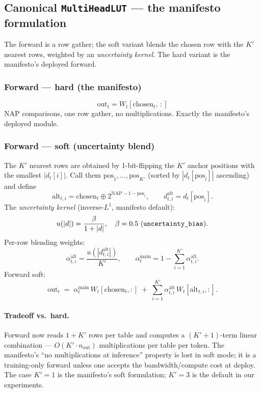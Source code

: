\documentclass[11pt]{article}
\begin{document}
\subsection{Canonical \texttt{MultiHeadLUT} --- the manifesto formulation}
\label{sec:can}

The forward is a row gather; the soft variant blends the chosen row with the
$K'$ nearest rows, weighted by an \emph{uncertainty kernel}. The hard
variant is the manifesto's deployed forward.

\subsubsection{Forward --- hard (the manifesto)}\label{sec:can-hard}
\[
  \text{out}_t = W_t[\mathrm{chosen}_t,\,:]
\]
NAP comparisons, one row gather, no multiplications. Exactly the manifesto's
deployed module.

\subsubsection{Forward --- soft (uncertainty blend)}\label{sec:can-soft}

The $K'$ nearest rows are obtained by 1-bit-flipping the $K'$ anchor
positions with the smallest $|d_t[i]|$. Call them $\mathrm{pos}_1,\ldots,\mathrm{pos}_{K'}$
(sorted by $|d_t[\mathrm{pos}_i]|$ ascending) and define
\[
  \mathrm{alt}_{t,i} = \mathrm{chosen}_t\oplus 2^{\mathrm{NAP}-1-\mathrm{pos}_i},
  \qquad
  d_{t,i}^{\mathrm{alt}} = d_t[\mathrm{pos}_i].
\]
The \emph{uncertainty kernel} (inverse-$L^1$, manifesto default):
\[
  u(|d|) = \frac{\beta}{1+|d|},\quad \beta=0.5\ \text{(\texttt{uncertainty\_bias})}.
\]
Per-row blending weights:
\[
  \alpha_{t,i}^{\mathrm{alt}} = \frac{u(|d_{t,i}^{\mathrm{alt}}|)}{K'},\qquad
  \alpha_t^{\mathrm{main}} = 1-\sum_{i=1}^{K'}\alpha_{t,i}^{\mathrm{alt}}.
\]
Forward soft:
\[
  \text{out}_t \;=\; \alpha_t^{\mathrm{main}}\,W_t[\mathrm{chosen}_t,:]
                 \;+\; \sum_{i=1}^{K'}\alpha_{t,i}^{\mathrm{alt}}\,W_t[\mathrm{alt}_{t,i},:].
\]

\paragraph{Tradeoff vs.\ hard.} Forward now reads $1{+}K'$ rows per table
and computes a $(K'{+}1)$-term linear combination ---
$O(K'\cdot n_{\mathrm{out}})$ multiplications per table per token. The
manifesto's ``no multiplications at inference'' property is lost in soft
mode; it is a training-only forward unless one accepts the
bandwidth/compute cost at deploy. The case $K'{=}1$ is the manifesto's
soft formulation; $K'{=}3$ is the default in our experiments.
\end{document}
